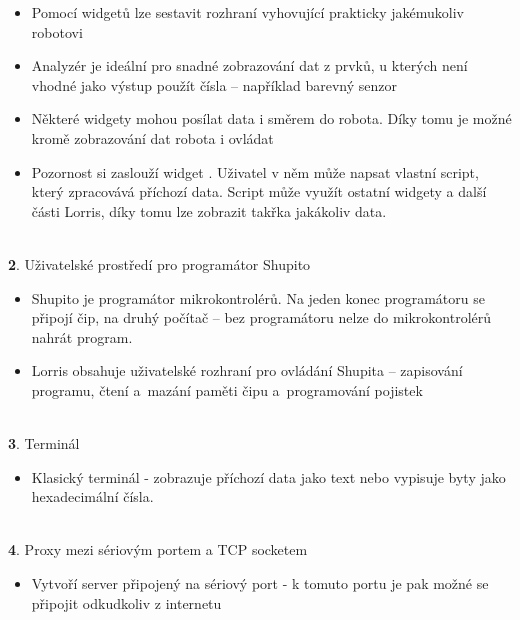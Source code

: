 \documentclass[17pt]{extreport}
\newcommand{\B}{\textbf} %
\begin{document}
\vspace{-7mm}
\begin{itemize} 
    \item Pomocí widgetů lze sestavit rozhraní vyhovující prakticky jakémukoliv robotovi
    \item Analyzér je ideální pro snadné zobrazování dat z prvků, u kterých není vhodné jako výstup použít čísla -- například barevný senzor
    \item Některé widgety mohou posílat data i směrem do robota. Díky tomu je možné kromě zobrazování dat robota i ovládat
    \item Pozornost si zaslouží widget . Uživatel v něm může napsat vlastní script, který zpracovává příchozí data. Script může využít ostatní widgety a další části Lorris, díky tomu lze zobrazit takřka jakákoliv data.
\end{itemize}
\\{\large \B 2. Uživatelské prostředí pro programátor Shupito }
\begin{itemize}
    \item Shupito je programátor mikrokontrolérů. Na jeden konec programátoru se připojí čip, na druhý počítač -- bez programátoru nelze do mikrokontrolérů nahrát program.
    \item Lorris obsahuje uživatelské rozhraní pro ovládání Shupita -- zapisování programu, čtení a~mazání paměti čipu a~programování pojistek
\end{itemize}
\\{\large \B 3. Terminál }
\begin{itemize}
    \item Klasický terminál - zobrazuje příchozí data jako text nebo vypisuje byty jako hexadecimální čísla.
\end{itemize}
\\{\large \B 4. Proxy mezi sériovým portem a TCP socketem }
\begin{itemize}
    \item Vytvoří server připojený na sériový port - k tomuto portu je pak možné se připojit odkudkoliv z internetu
\end{itemize}
\end{document}
